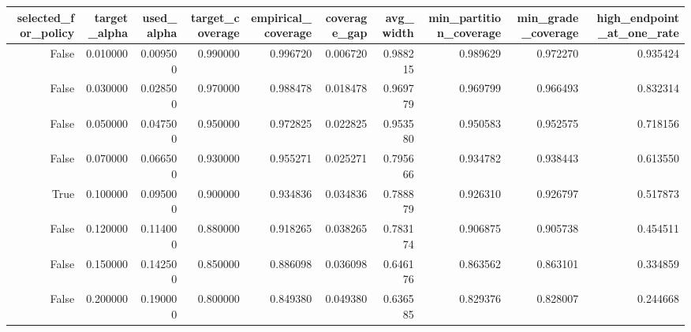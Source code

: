 \begin{tabular}{rrrrrrrrrr}
\toprule
selected\_for\_policy & target\_alpha & used\_alpha & target\_coverage & empirical\_coverage & coverage\_gap & avg\_width & min\_partition\_coverage & min\_grade\_coverage & high\_endpoint\_at\_one\_rate \\
\midrule
False & 0.010000 & 0.009500 & 0.990000 & 0.996720 & 0.006720 & 0.988215 & 0.989629 & 0.972270 & 0.935424 \\
False & 0.030000 & 0.028500 & 0.970000 & 0.988478 & 0.018478 & 0.969779 & 0.969799 & 0.966493 & 0.832314 \\
False & 0.050000 & 0.047500 & 0.950000 & 0.972825 & 0.022825 & 0.953580 & 0.950583 & 0.952575 & 0.718156 \\
False & 0.070000 & 0.066500 & 0.930000 & 0.955271 & 0.025271 & 0.795666 & 0.934782 & 0.938443 & 0.613550 \\
True & 0.100000 & 0.095000 & 0.900000 & 0.934836 & 0.034836 & 0.788879 & 0.926310 & 0.926797 & 0.517873 \\
False & 0.120000 & 0.114000 & 0.880000 & 0.918265 & 0.038265 & 0.783174 & 0.906875 & 0.905738 & 0.454511 \\
False & 0.150000 & 0.142500 & 0.850000 & 0.886098 & 0.036098 & 0.646176 & 0.863562 & 0.863101 & 0.334859 \\
False & 0.200000 & 0.190000 & 0.800000 & 0.849380 & 0.049380 & 0.636585 & 0.829376 & 0.828007 & 0.244668 \\
\bottomrule
\end{tabular}
